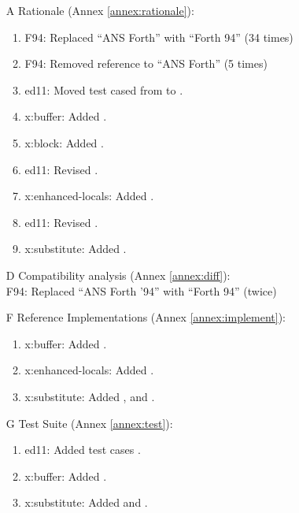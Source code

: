 \begin{itemize}
	\item[A] Rationale								(Annex \ref{annex:rationale}):
		\begin{enumerate}
		\item \textsf{F94}: Replaced ``ANS Forth'' with ``Forth 94''
			(34 times)
		\item \textsf{F94}: Removed reference to ``ANS Forth''
			(5 times)
		\item \textsf{ed11}: Moved test cased from  to .
		\item \textsf{x:buffer}: Added .
		\item \textsf{x:block}: Added .
		\item \textsf{ed11}: Revised .
		\item \textsf{x:enhanced-locals}:
			Added .
		\item \textsf{ed11}: Revised .
		\item \textsf{x:substitute}: Added .
		\end{enumerate}
		
	\item[D] Compatibility analysis 				(Annex \ref{annex:diff}): \\
		\textsf{F94}: Replaced ``ANS Forth '94'' with ``Forth 94''
			(twice)

	\item[F] Reference Implementations			(Annex \ref{annex:implement}):
		\begin{enumerate}
		\item \textsf{x:buffer}: Added .
		\item \textsf{x:enhanced-locals}: Added .
		\item \textsf{x:substitute}: Added
			,
			 and
			.
		\end{enumerate}

	\item[G] Test Suite								(Annex \ref{annex:test}):
		\begin{enumerate}
		\item \textsf{ed11}: Added test cases .
		\item \textsf{x:buffer}: Added .
		\item \textsf{x:substitute}: Added
			 and
			.
		\end{enumerate}
	\end{itemize}



